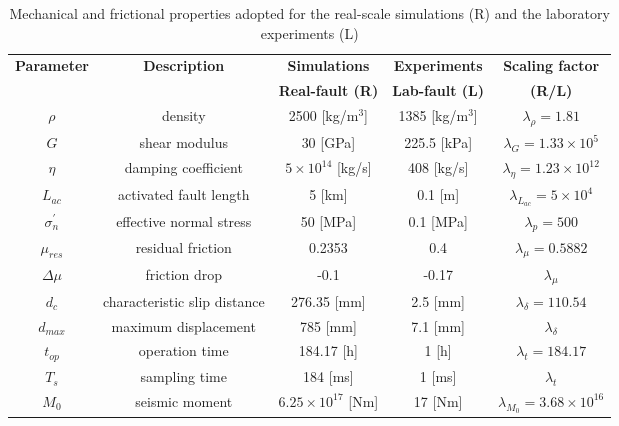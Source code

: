 \documentclass[journal,twoside,web]{ieeecolor}
\begin{document}
\begin{table*}[ht!]
\caption{Mechanical and frictional properties adopted for the real-scale simulations (R) and the laboratory experiments (L)}
\begin{center}
\begin{threeparttable}  
\begin{tabular}{|c|c|c|c|c|}
\hline 
\textbf{Parameter} & \textbf{Description} & \textbf{Simulations} & \textbf{Experiments}\tnote{1} & \textbf{Scaling factor}\tnote{2} \\ 
 &  & \textbf{Real-fault (R)} & \textbf{Lab-fault (L)} & \textbf{(R/L)} \\ 
\hline 
$\rho$ & density & 2500 [kg/m$^3$] & 1385 [kg/m$^3$] & $\lambda_\rho=1.81$ \\ 

$G$ & shear modulus & 30 [GPa] & 225.5 [kPa] & $\lambda_G=1.33\times 10^5$  \\ 
 
$\eta$ & damping coefficient & $5\times 10^{14}$ [kg/s] & 408 [kg/s] & $\lambda_\eta=1.23\times 10^{12}$ \\ 

$L_{ac}$ & activated fault length & 5 [km] & 0.1 [m] & $\lambda_{L_{ac}}=5\times 10^4$ \\ 

$\sigma_n^\prime$ & effective normal stress & 50 [MPa] & 0.1 [MPa] & $\lambda_p=500$ \\ 
 
$\mu_{res}$ & residual friction & 0.2353 & 0.4 & $\lambda_\mu=0.5882$ \\ 

$\Delta \mu$ & friction drop & -0.1 & -0.17 & $\lambda_\mu$ \\ 
 
$d_c$ & characteristic slip distance & 276.35 [mm] & 2.5 [mm] & $\lambda_\delta=110.54$ \\ 

$d_{max}$ & maximum displacement & 785 [mm] & 7.1 [mm] & $\lambda_\delta$ \\ 
 
$t_{op}$ & operation time & 184.17 [h] & 1 [h] & $\lambda_t=184.17$ \\ 

$T_s$ & sampling time & 184 [ms] & 1 [ms] & $\lambda_t$ \\ 
  
$M_0$ & seismic moment & $6.25\times 10^{17}$ [Nm] & 17 [Nm] & $\lambda_{M_0}=3.68\times 10^{16}$ \\ 
 

\end{tabular}
\end{threeparttable}
\end{center}
\end{table*}
\end{document}
